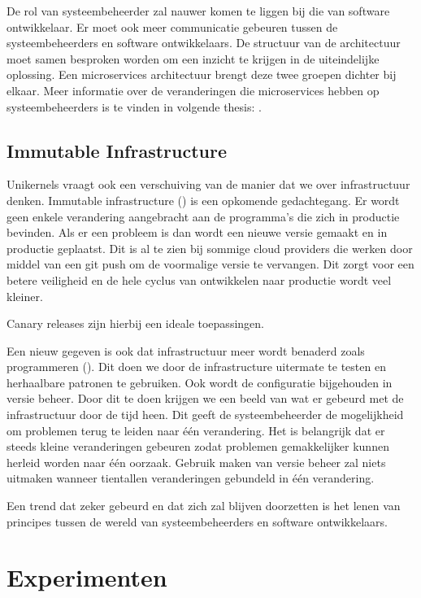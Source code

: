\documentclass[pdftex,a4paper,12pt,twoside]{report}
\begin{document}
De rol van systeembeheerder zal nauwer komen te liggen bij die van software ontwikkelaar. Er moet ook meer communicatie gebeuren tussen de systeembeheerders en software ontwikkelaars. De structuur van de architectuur moet samen besproken worden om een inzicht te krijgen in de uiteindelijke oplossing. Een microservices architectuur brengt deze twee groepen dichter bij elkaar. Meer informatie over de veranderingen die microservices hebben op systeembeheerders is te vinden in volgende thesis: \cite{balalaie_microservices_2016}.

\section{Immutable Infrastructure}

Unikernels vraagt ook een verschuiving van de manier dat we over infrastructuur denken. Immutable infrastructure (\cite{martin_fowler_phoenixserver_2012}) is een opkomende gedachtegang. Er wordt geen enkele verandering aangebracht aan de programma's die zich in productie bevinden. Als er een probleem is dan wordt een nieuwe versie gemaakt en in productie geplaatst. Dit is al te zien bij sommige cloud providers die werken door middel van een git push om de voormalige versie te vervangen. Dit zorgt voor een betere veiligheid en de hele cyclus van ontwikkelen naar productie wordt veel kleiner.

Canary releases zijn hierbij een ideale toepassingen.

Een nieuw gegeven is ook dat infrastructuur meer wordt benaderd zoals programmeren (\cite{morris_infrastructure_2016}). Dit doen we door de infrastructure uitermate te testen en herhaalbare patronen te gebruiken. Ook wordt de configuratie bijgehouden in versie beheer. Door dit te doen krijgen we een beeld van wat er gebeurd met de infrastructuur door de tijd heen. Dit geeft de systeembeheerder de mogelijkheid om problemen terug te leiden naar één verandering. Het is belangrijk dat er steeds kleine veranderingen gebeuren zodat problemen gemakkelijker kunnen herleid worden naar één oorzaak. Gebruik maken van versie beheer zal niets uitmaken wanneer tientallen veranderingen gebundeld in één verandering.

Een trend dat zeker gebeurd en dat zich zal blijven doorzetten is het lenen van principes tussen de wereld van systeembeheerders en software ontwikkelaars.

\chapter{Experimenten}
\label{ch:experimenten}
\end{document}
